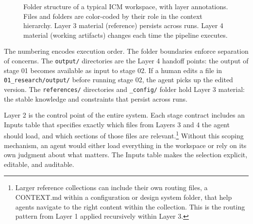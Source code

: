 \documentclass[acmlarge,nonacm,screen]{acmart}
\begin{document}
\begin{figure}[t]
\caption{Folder structure of a typical ICM workspace, with layer annotations. Files and folders are color-coded by their role in the context hierarchy. Layer 3 material (reference) persists across runs. Layer 4 material (working artifacts) changes each time the pipeline executes.}
\label{fig:folders}
\end{figure}

The numbering encodes execution order. The folder boundaries enforce separation of concerns. The \texttt{output/} directories are the Layer 4 handoff points: the output of stage 01 becomes available as input to stage 02. If a human edits a file in \texttt{01\_research/output/} before running stage 02, the agent picks up the edited version. The \texttt{references/} directories and \texttt{\_config/} folder hold Layer 3 material: the stable knowledge and constraints that persist across runs.

Layer 2 is the control point of the entire system. Each stage contract includes an Inputs table that specifies exactly which files from Layers 3 and 4 the agent should load, and which sections of those files are relevant.\footnote{Larger reference collections can include their own routing files, a CONTEXT.md within a configuration or design system folder, that help agents navigate to the right content within the collection. This is the routing pattern from Layer 1 applied recursively within Layer 3.} Without this scoping mechanism, an agent would either load everything in the workspace or rely on its own judgment about what matters. The Inputs table makes the selection explicit, editable, and auditable.
\end{document}
